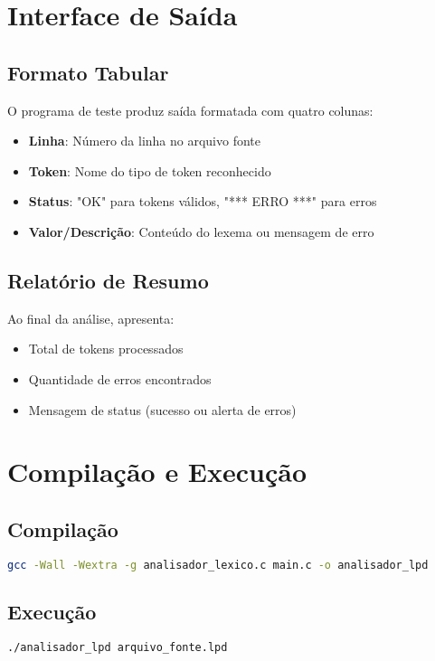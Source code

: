 \documentclass[12pt]{article}
\begin{document}
\section{Interface de Saída}

\subsection{Formato Tabular}
O programa de teste produz saída formatada com quatro colunas:
\begin{itemize}[noitemsep]
    \item \textbf{Linha}: Número da linha no arquivo fonte
    \item \textbf{Token}: Nome do tipo de token reconhecido
    \item \textbf{Status}: "OK" para tokens válidos, "*** ERRO ***" para erros
    \item \textbf{Valor/Descrição}: Conteúdo do lexema ou mensagem de erro
\end{itemize}

\subsection{Relatório de Resumo}
Ao final da análise, apresenta:
\begin{itemize}[noitemsep]
    \item Total de tokens processados
    \item Quantidade de erros encontrados
    \item Mensagem de status (sucesso ou alerta de erros)
\end{itemize}

\section{Compilação e Execução}

\subsection{Compilação}
\begin{lstlisting}[language=bash]
gcc -Wall -Wextra -g analisador_lexico.c main.c -o analisador_lpd
\end{lstlisting}

\subsection{Execução}
\begin{lstlisting}[language=bash]
./analisador_lpd arquivo_fonte.lpd
\end{lstlisting}
\end{document}

